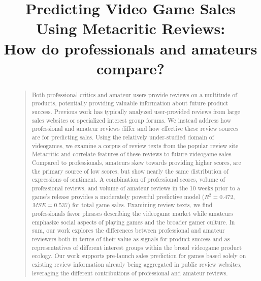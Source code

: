 \documentclass[letterpaper]{article}
\begin{document}
%
\title{Predicting Video Game Sales Using Metacritic Reviews:\\How do professionals and amateurs compare?}
\author{
}
\maketitle

\begin{abstract}
\begin{quote}
Both professional critics and amateur users provide reviews on a multitude of products, potentially providing valuable information about future product success. Previous work has typically analyzed user-provided reviews from large sales websites or specialized interest group forums. We instead address how professional and amateur reviews differ and how effective these review sources are for predicting sales. Using the relatively under-studied domain of videogames, we examine a corpus of review texts from the popular review site Metacritic and correlate features of these reviews to future videogame sales. Compared to professionals, amateurs skew towards providing higher scores, are the primary source of low scores, but show nearly the same distribution of expressions of sentiment. A combination of professional scores, volume of professional reviews, and volume of amateur reviews in the 10 weeks prior to a game's release provides a moderately powerful predictive model ($R^2 = 0.472$, $MSE = 0.537$) for total game sales. Examining review texts, we find professionals favor phrases describing the videogame market while amateurs emphasize social aspects of playing games and the broader gamer culture. In sum, our work explores the differences between professional and amateur reviewers both in terms of their value as signals for product success and as representatives of different interest groups within the broad videogame product ecology. Our work supports pre-launch sales prediction for games based solely on existing review information already being aggregated in public review websites, leveraging the different contributions of professional and amateur reviews.
\end{quote}
\end{abstract}
\end{document}
